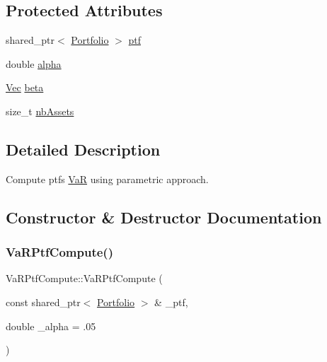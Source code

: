 \subsection*{Protected Attributes}
\begin{DoxyCompactItemize}
\item 
shared\+\_\+ptr$<$ \hyperlink{classPortfolio}{Portfolio} $>$ \hyperlink{classVaRPtfCompute_a67c2129848686adc86d76dfa95089116}{ptf}
\item 
double \hyperlink{classVaRPtfCompute_aa56625fe3b4517b29343d23a6fe5ecad}{alpha}
\item 
\hyperlink{compute__returns__eigen_8h_a1eb6a9306ef406d7975f3cbf2e247777}{Vec} \hyperlink{classVaRPtfCompute_a6463d2c66463890a7e8e720f2865021a}{beta}
\item 
size\+\_\+t \hyperlink{classVaRPtfCompute_a8461d45e60e76c7205f7f98e1c44ccc6}{nb\+Assets}
\end{DoxyCompactItemize}


\subsection{Detailed Description}
Compute ptf\textquotesingle{}s \hyperlink{classVaR}{VaR} using parametric approach. 

\subsection{Constructor \& Destructor Documentation}
\hypertarget{classVaRPtfCompute_a9e9759706e5c6c69b6d838bb1f01b842}{}\label{classVaRPtfCompute_a9e9759706e5c6c69b6d838bb1f01b842} 
\subsubsection{\texorpdfstring{Va\+R\+Ptf\+Compute()}{VaRPtfCompute()}\hspace{0.1cm}{\footnotesize\ttfamily [1/2]}}
{\footnotesize\ttfamily Va\+R\+Ptf\+Compute\+::\+Va\+R\+Ptf\+Compute (\begin{DoxyParamCaption}\item[{const shared\+\_\+ptr$<$ \hyperlink{classPortfolio}{Portfolio} $>$ \&}]{\+\_\+ptf,  }\item[{double}]{\+\_\+alpha = {\ttfamily .05} }\end{DoxyParamCaption})}

